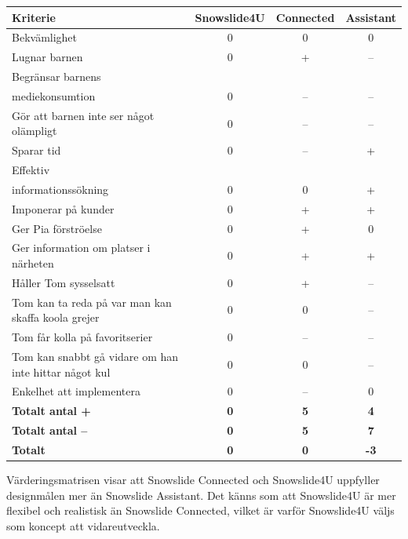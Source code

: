 \documentclass[a4paper,12pt,titlepage]{article}
\begin{document}
\renewcommand*{\arraystretch}{1.3}
\begin{longtable}[l]{p{4cm} c c c}
    \textbf{Kriterie} & \textbf{Snowslide4U} & \textbf{Connected} & \textbf{Assistant} \\ \midrule
    Bekvämlighet                                            & 0 & 0  & 0  \\ \midrule
    Lugnar barnen                                           & 0 & +  & -- \\ \midrule
    Begränsar barnens \\ mediekonsumtion                    & 0 & -- & -- \\ \midrule
    Gör att barnen inte ser något olämpligt                 & 0 & -- & -- \\ \midrule
    Sparar tid                                              & 0 & -- & +  \\ \midrule
    Effektiv \\ informationssökning                         & 0 & 0  & +  \\ \midrule
    Imponerar på kunder                                     & 0 & +  & +  \\ \midrule
    Ger Pia förströelse                                     & 0 & +  & 0  \\ \midrule
    Ger information om platser i närheten                   & 0 & +  & +  \\ \midrule
    Håller Tom sysselsatt                                   & 0 & +  & -- \\ \midrule
    Tom kan ta reda på var man kan skaffa koola grejer      & 0 & 0  & -- \\ \midrule
    Tom får kolla på favoritserier                          & 0 & -- & -- \\ \midrule
    Tom kan snabbt gå vidare om han inte hittar något kul   & 0 & 0  & -- \\ \midrule
    Enkelhet att implementera                               & 0 & --  & 0 \\ \midrule
    \textbf{Totalt antal + }      & \textbf{0} & \textbf{5}  & \textbf{4} \\ \midrule
    \textbf{Totalt antal --}      & \textbf{0} & \textbf{5}  & \textbf{7} \\ \midrule
    \textbf{Totalt}      & \textbf{0} & \textbf{0}  & \textbf{-3} \\
\end{longtable}

Värderingsmatrisen visar att Snowslide Connected och Snowslide4U
uppfyller designmålen mer än Snowslide Assistant. Det känns som att Snowslide4U
är mer flexibel och realistisk än Snowslide Connected, vilket är
varför Snowslide4U väljs som koncept att vidareutveckla.
\end{document}
